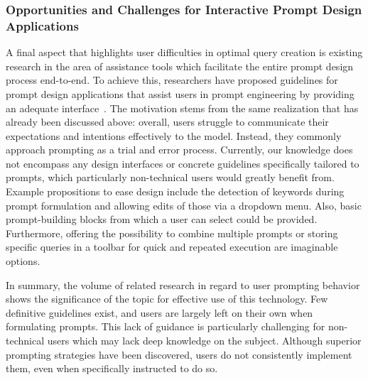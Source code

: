 \subsubsection{Opportunities and Challenges for Interactive Prompt Design Applications}
A final aspect that highlights user difficulties in optimal query creation is existing
research in the area of assistance tools which facilitate the entire prompt design process
end-to-end.
To achieve this, researchers have proposed guidelines for prompt design applications that assist
users in prompt engineering by providing an adequate interface~\cite{dang_how_2022}.
The motivation stems from the same realization that has already been discussed above: overall,
users struggle to communicate their expectations and intentions effectively to the model.
Instead, they commonly approach prompting as a trial and error process.
Currently, our knowledge does not encompass any design interfaces or concrete
guidelines specifically tailored to prompts, which particularly non-technical users would greatly
benefit from.
Example propositions to ease design include the detection of keywords during prompt formulation and
allowing edits of those via a dropdown menu.
Also, basic prompt-building blocks from which a user can select could be provided.
Furthermore, offering the possibility to combine multiple prompts or storing specific queries
in a toolbar for quick and repeated execution are imaginable options.
\newline

In summary, the volume of related research in regard to user prompting behavior shows the
significance of the topic for effective use of this technology.
Few definitive guidelines exist, and users are largely left on their own when formulating prompts.
This lack of guidance is particularly challenging for non-technical users which may lack deep
knowledge on the subject.
Although superior prompting strategies have been discovered, users do not consistently
implement them, even when specifically instructed to do so.
